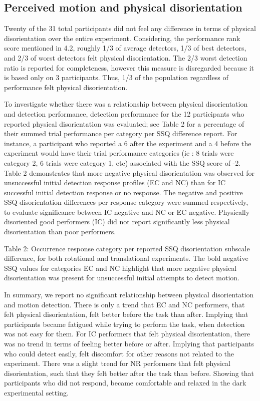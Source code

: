 \documentclass[11pt, onecolumn]{article}
\begin{document}
\subsection{Perceived motion and physical disorientation}
Twenty of the 31 total participants did not feel any difference in terms of physical disorientation over the entire experiment.  Considering, the performance rank score mentioned in 4.2, roughly 1/3 of average detectors, 1/3 of best detectors, and 2/3 of worst detectors felt physical disorientation.  The 2/3 worst detection ratio is reported for completeness, however this measure is disregarded because it is based only on 3 participants.  Thus, 1/3 of the population regardless of performance felt physical disorientation.

To investigate whether there was a relationship between physical disorientation and detection performance, detection performance for the 12 participants who reported physical disorientation was evaluated; see Table 2 for a percentage of their summed trial performance per category per SSQ difference report.  For instance, a participant who reported a 6 after the experiment and a 4 before the experiment would have their trial performance categories (ie : 8 trials were category 2, 6 trials were category 1, etc) associated with the SSQ score of -2.  Table 2 demonstrates that more negative physical disorientation was observed for unsuccessful initial detection response profiles (EC and NC) than for IC successful initial detection response or no response. The negative and positive SSQ disorientation differences per response category were summed respectively, to evaluate significance between IC negative and NC or EC negative.  Physically disoriented good performers (IC) did not report significantly less physical disorientation than poor performers.


Table 2: Occurrence response category per reported SSQ disorientation subscale difference, for both rotational and translational experiments.  The bold negative SSQ values for categories EC and NC highlight that more negative physical disorientation was present for unsuccessful initial attempts to detect motion.

In summary, we report no significant relationship between physical disorientation and motion detection.  There is only a trend that EC and NC performers, that felt physical disorientation, felt better before the task than after.  Implying that participants became fatigued while trying to perform the task, when detection was not easy for them.  For IC performers that felt physical disorientation, there was no trend in terms of feeling better before or after.  Implying that participants who could detect easily, felt discomfort for other reasons not related to the experiment.  There was a slight trend for NR performers that felt physical disorientation, such that they felt better after the task than before.  Showing that participants who did not respond, became comfortable and relaxed in the dark experimental setting.
\end{document}
